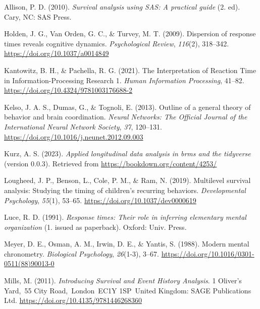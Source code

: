 \documentclass[
  man,floatsintext]{apa6}
\newlength{\cslhangindent}
\newenvironment{CSLReferences}[2] %
 {\begin{list}{}{%
  \setlength{\itemindent}{0pt}
  \setlength{\leftmargin}{0pt}
  \setlength{\parsep}{0pt}
  \ifodd #1
   \setlength{\leftmargin}{\cslhangindent}
   \setlength{\itemindent}{-1\cslhangindent}
  \fi
  \setlength{\itemsep}{#2\baselineskip}}}
 {\end{list}}
\begin{document}
\label{refs}
\begin{CSLReferences}{1}{0}
Allison, P. D. (2010). \emph{Survival analysis using {SAS}: A practical guide} (2. ed). Cary, NC: SAS Press.

Holden, J. G., Van Orden, G. C., \& Turvey, M. T. (2009). Dispersion of response times reveals cognitive dynamics. \emph{Psychological Review}, \emph{116}(2), 318--342. \url{https://doi.org/10.1037/a0014849}

Kantowitz, B. H., \& Pachella, R. G. (2021). The {Interpretation} of {Reaction Time} in {Information-Processing Research} 1. \emph{Human Information Processing}, 41--82. \url{https://doi.org/10.4324/9781003176688-2}

Kelso, J. A. S., Dumas, G., \& Tognoli, E. (2013). Outline of a general theory of behavior and brain coordination. \emph{Neural Networks: The Official Journal of the International Neural Network Society}, \emph{37}, 120--131. \url{https://doi.org/10.1016/j.neunet.2012.09.003}

Kurz, A. S. (2023). \emph{Applied longitudinal data analysis in brms and the tidyverse} (version 0.0.3). Retrieved from \url{https://bookdown.org/content/4253/}

Lougheed, J. P., Benson, L., Cole, P. M., \& Ram, N. (2019). Multilevel survival analysis: {Studying} the timing of children's recurring behaviors. \emph{Developmental Psychology}, \emph{55}(1), 53--65. \url{https://doi.org/10.1037/dev0000619}

Luce, R. D. (1991). \emph{Response times: Their role in inferring elementary mental organization} (1. issued as paperback). Oxford: Univ. Press.

Meyer, D. E., Osman, A. M., Irwin, D. E., \& Yantis, S. (1988). Modern mental chronometry. \emph{Biological Psychology}, \emph{26}(1-3), 3--67. \url{https://doi.org/10.1016/0301-0511(88)90013-0}

Mills, M. (2011). \emph{Introducing {Survival} and {Event History Analysis}}. 1 Oliver's Yard,~55 City Road,~London~EC1Y 1SP~United Kingdom: SAGE Publications Ltd. \url{https://doi.org/10.4135/9781446268360}


\end{CSLReferences}
\end{document}
